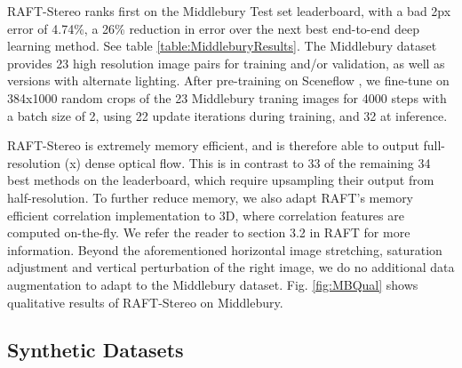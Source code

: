 \documentclass[10pt,twocolumn,letterpaper]{article}
\begin{document}
RAFT-Stereo ranks first on the Middlebury Test set leaderboard, with a bad 2px error of 4.74\%, a 26\% reduction in error over the next best end-to-end deep learning method. See table \ref{table:MiddleburyResults}. The Middlebury dataset provides 23 high resolution image pairs for training and/or validation, as well as versions with alternate lighting. After pre-training on Sceneflow \cite{sceneflow}, we fine-tune on 384x1000 random crops of the 23 Middlebury traning images for 4000 steps with a batch size of 2, using 22 update iterations during training, and 32 at inference.

RAFT-Stereo is extremely memory efficient, and is therefore able to output full-resolution (x) dense optical flow. This is in contrast to 33 of the remaining 34 best methods on the leaderboard, which require upsampling their output from half-resolution. To further reduce memory, we also adapt RAFT's memory efficient correlation implementation to 3D, where correlation features are computed on-the-fly. We refer the reader to section 3.2 in RAFT \cite{teed2020raft} for more information. Beyond the aforementioned horizontal image stretching, saturation adjustment and vertical perturbation of the right image, we do no additional data augmentation to adapt to the Middlebury dataset. Fig. \ref{fig:MBQual} shows qualitative results of RAFT-Stereo on Middlebury. 



\subsection{Synthetic Datasets}

\begin{table*}[t]
\centering
{}
\caption{Synthetic data generalization experiments. All experiments were run twice with different weight initializations and the validation performances were averaged. Data were balanced so that each dataset represents an equal proportion of the training data. Experiments were done using RAFT-Stereo with a single hidden-state with random cropping and vertical perturbation of the right image. }
\label{table:syntheticdata}
\end{table*}
\end{document}
